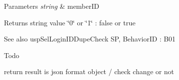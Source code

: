 \begin{DoxyParams}{Parameters}
{\em string} & member\+ID \\
\hline
\end{DoxyParams}
\begin{DoxyReturn}{Returns}
string value \char`\"{}0\char`\"{} or \char`\"{}1\char`\"{} \+: false or true 
\end{DoxyReturn}
\begin{DoxySeeAlso}{See also}
usp\+Sel\+Login\+I\+D\+Dupe\+Check SP, Behavior\+ID \+: B01 
\end{DoxySeeAlso}
\begin{DoxyRefDesc}{Todo}
\item[\hyperlink{a00001__todo000010}{Todo}]return result is json format object / check change or not \end{DoxyRefDesc}
